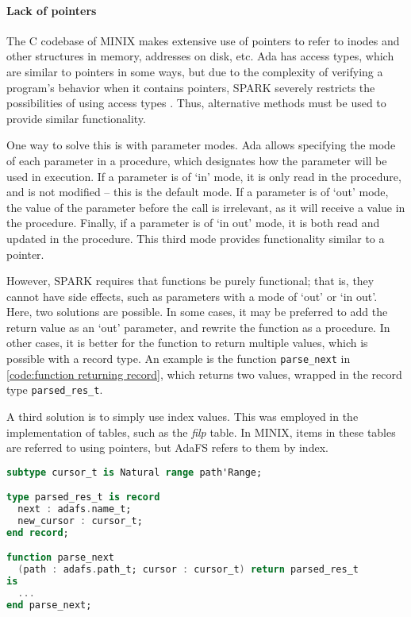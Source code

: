 \paragraph{Lack of pointers}
The C codebase of MINIX makes extensive use of pointers to refer to inodes and other structures in memory, addresses on disk, etc.
Ada has access types, which are similar to pointers in some ways, but due to the complexity of verifying a program's behavior when it contains pointers, SPARK severely restricts the possibilities of using access types \cite{sparkRM}.
Thus, alternative methods must be used to provide similar functionality.

One way to solve this is with parameter modes.
Ada allows specifying the mode of each parameter in a procedure, which designates how the parameter will be used in execution.
If a parameter is of `in' mode, it is only read in the procedure, and is not modified -- this is the default mode.
If a parameter is of `out' mode, the value of the parameter before the call is irrelevant, as it will receive a value in the procedure.
Finally, if a parameter is of `in out' mode, it is both read and updated in the procedure.
This third mode provides functionality similar to a pointer.

However, SPARK requires that functions be purely functional; that is, they cannot have side effects, such as parameters with a mode of `out' or `in out'.
Here, two solutions are possible.
In some cases, it may be preferred to add the return value as an `out' parameter, and rewrite the function as a procedure.
In other cases, it is better for the function to return multiple values, which is possible with a record type.
An example is the function \lstinline[language=Ada]{parse_next} in \autoref{code:function returning record}, which returns two values, wrapped in the record type \lstinline[language=Ada]{parsed_res_t}.

A third solution is to simply use index values.
This was employed in the implementation of tables, such as the \textit{filp} table.
In MINIX, items in these tables are referred to using pointers, but AdaFS refers to them by index.

\begin{lstlisting}[float=tb,caption={Parse function returning the parsed component and the new cursor position (ellipses denote code omitted for brevity)}, label={code:function returning record}, language=Ada]
subtype cursor_t is Natural range path'Range;

type parsed_res_t is record
  next : adafs.name_t;
  new_cursor : cursor_t;
end record;

function parse_next
  (path : adafs.path_t; cursor : cursor_t) return parsed_res_t
is
  ...
end parse_next;
\end{lstlisting}

